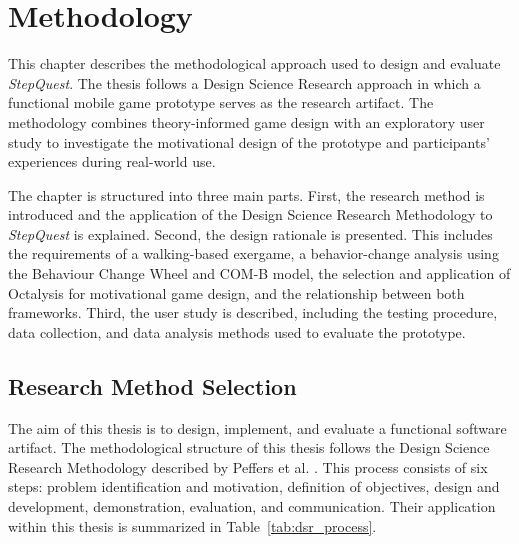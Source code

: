 \chapter{Methodology}

This chapter describes the methodological approach used to design and evaluate \textit{StepQuest}. The thesis follows a Design Science Research approach in which a functional mobile game prototype serves as the research artifact. The methodology combines theory-informed game design with an exploratory user study to investigate the motivational design of the prototype and participants' experiences during real-world use.

The chapter is structured into three main parts. First, the research method is introduced and the application of the Design Science Research Methodology to \textit{StepQuest} is explained. Second, the design rationale is presented. This includes the requirements of a walking-based exergame, a behavior-change analysis using the Behaviour Change Wheel and COM-B model, the selection and application of Octalysis for motivational game design, and the relationship between both frameworks. Third, the user study is described, including the testing procedure, data collection, and data analysis methods used to evaluate the prototype.

\section{Research Method Selection}

The aim of this thesis is to design, implement, and evaluate a functional software artifact. The methodological structure of this thesis follows the Design Science Research Methodology described by Peffers et al. \cite{Peffers2007DSRM}. This process consists of six steps: problem identification and motivation, definition of objectives, design and development, demonstration, evaluation, and communication. Their application within this thesis is summarized in Table~\ref{tab:dsr_process}.

